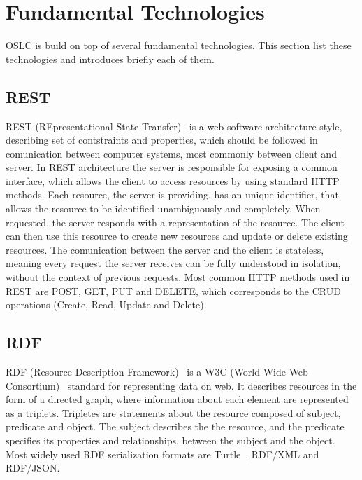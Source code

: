 \section{Fundamental Technologies}
\label {sec:oslc_fundamental_technologies}
OSLC is build on top of several fundamental technologies. This section list these technologies and introduces briefly each of them.

\subsection*{REST}
REST (REpresentational State Transfer) \cite{rest} is a web software architecture style, describing set of contstraints and properties, which should be followed in comunication between computer systems, most commonly between client and server. In REST architecture the server is responsible for exposing a common interface, which allows the client to access resources by using standard HTTP methods. Each resource, the server is providing, has an unique identifier, that allows the resource to be identified unambiguously and completely. When requested, the server responds with a representation of the resource. The client can then use this resource to create new resources and update or delete existing resources. The comunication between the server and the client is stateless, meaning every request the server receives can be fully understood in isolation, without the context of previous requests. Most common HTTP methods used in REST are POST, GET, PUT and DELETE, which corresponds to the CRUD operations (Create, Read, Update and Delete).

\subsection*{RDF}
RDF (Resource Description Framework) \cite{rdf} is a W3C (World Wide Web Consortium) \cite{w3c} standard for representing data on web. It describes resources in the form of a directed graph, where information about each element are represented as a triplets. Tripletes are statements about the resource composed of subject, predicate and object. The subject describes the the resource, and the predicate specifies its properties and relationships, between the subject and the object. Most widely used RDF serialization formats are Turtle \cite{turtle}, RDF/XML and RDF/JSON.

